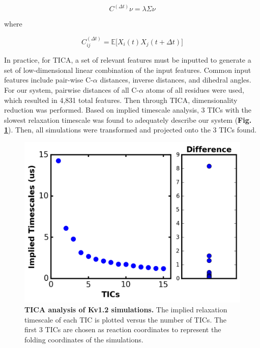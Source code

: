 \begin{equation}
C^{(\Delta t)} \nu = \lambda \Sigma \nu
\end{equation}

where

\begin{equation}
C_{ij}^{(\Delta t)} = \mathbb{E} \Big[ X_{i}(t)X_{j}(t+\Delta t)\Big]
\end{equation}

In practice, for TICA, a set of relevant features must be inputted to generate a set of low-dimensional linear combination of the input features. Common input features include pair-wise C-$\alpha$ distances, inverse distances, and dihedral angles. For our system, pairwise distances of all C-$\alpha$ atoms of all residues were used, which resulted in 4,831 total features. Then through TICA, dimensionality reduction was performed. Based on implied timescale analysis, 3 TICs with the slowest relaxation timescale was found to adequately describe our system (\textbf{Fig. \ref{fig:ch2_f1}}). Then, all simulations were transformed and projected onto the 3 TICs found.

\begin{figure}[!ht]
\begin{center}
	\includegraphics[width=13cm]{figures/chapter2/Fig2-1_implied_timescale.png}
\end{center}
	\caption{\textbf{TICA analysis of Kv1.2 simulations.} The implied relaxation timescale of each TIC is plotted versus the number of TICs. The first 3 TICs are chosen as reaction coordinates to represent the folding coordinates of the simulations.}
	\label{fig:ch2_f1}
\end{figure}

